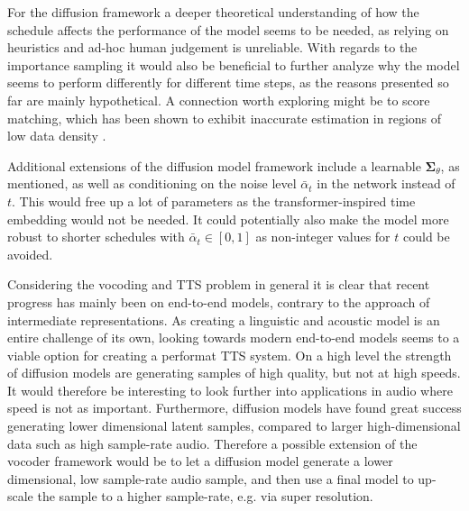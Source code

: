\documentclass{report}
\begin{document}
For the diffusion framework a deeper theoretical understanding of how the schedule affects the performance of the model seems to be needed, as relying on heuristics and ad-hoc human judgement is unreliable. With regards to the importance sampling it would also be beneficial to further analyze why the model seems to perform differently for different time steps, as the reasons presented so far are mainly hypothetical. A connection worth exploring might be to score matching, which has been shown to exhibit inaccurate estimation in regions of low data density \cite{song2019generative}. 

Additional extensions of the diffusion model framework include a learnable $\bm{\Sigma}_{\theta}$, as mentioned, as well as conditioning on the noise level $\bar{\alpha}_t$ in the network instead of $t$. This would free up a lot of parameters as the transformer-inspired time embedding would not be needed. It could potentially also make the model more robust to shorter schedules with $\bar{\alpha}_t \in [0, 1]$ as non-integer values for $t$ could be avoided.

Considering the vocoding and TTS problem in general it is clear that recent progress has mainly been on end-to-end models, contrary to the approach of intermediate representations. As creating a linguistic and acoustic model is an entire challenge of its own, looking towards modern end-to-end models seems to a viable option for creating a performat TTS system. On a high level the strength of diffusion models are generating samples of high quality, but not at high speeds. It would therefore be interesting to look further into applications in audio where speed is not as important. Furthermore, diffusion models have found great success generating lower dimensional latent samples, compared to larger high-dimensional data such as high sample-rate audio. Therefore a possible extension of the vocoder framework would be to let a diffusion model generate a lower dimensional, low sample-rate audio sample, and then use a final model to up-scale the sample to a higher sample-rate, e.g. via super resolution.

\newpage



\end{document}
